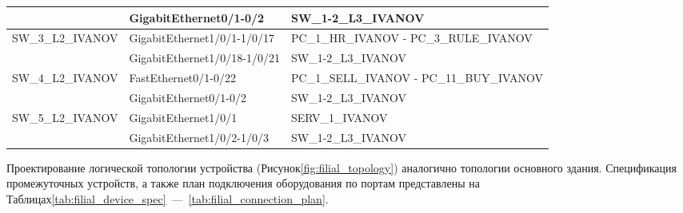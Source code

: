 \documentclass[14pt, a4paper]{extarticle}
\begin{document}
\begin{table}[H]
\begin{tabularx}{\textwidth}{|s|s|s|}
                        & GigabitEthernet0/1-0/2       & SW\_1-2\_L3\_IVANOV                       \\ \hline
    SW\_3\_L2\_IVANOV   & GigabitEthernet1/0/1-1/0/17  & PC\_1\_HR\_IVANOV - PC\_3\_RULE\_IVANOV   \\ 
                        & GigabitEthernet1/0/18-1/0/21 & SW\_1-2\_L3\_IVANOV                       \\ \hline
    SW\_4\_L2\_IVANOV   & FastEthernet0/1-0/22         & PC\_1\_SELL\_IVANOV - PC\_11\_BUY\_IVANOV \\ 
                        & GigabitEthernet0/1-0/2       & SW\_1-2\_L3\_IVANOV                       \\ \hline
    SW\_5\_L2\_IVANOV   & GigabitEthernet1/0/1         & SERV\_1\_IVANOV                           \\ 
                        & GigabitEthernet1/0/2-1/0/3   & SW\_1-2\_L3\_IVANOV                       \\ \hline
  \end{tabularx}
\end{table}


Проектирование логической топологии устройства
(Рисунок\;\ref{fig:filial_topology}) аналогично топологии основного
здания. Спецификация промежуточных устройств, а также план подключения
оборудования по портам представлены на
Таблицах\;\ref{tab:filial_device_spec}~---~\ref{tab:filial_connection_plan}.
\end{document}
